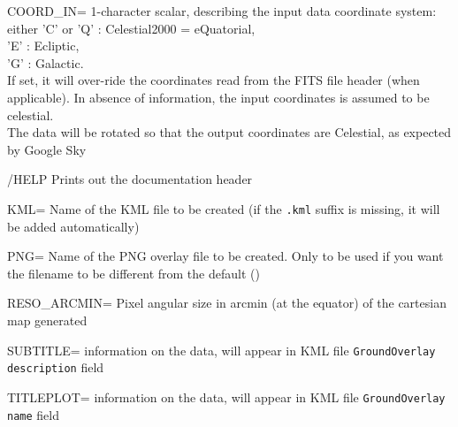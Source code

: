 \begin{keywords}
  \begin{kwlist}{} %
\item [COORD\_IN= \mytarget{idl:hpx2gs:coord_in}] 1-character scalar, describing the input data coordinate system:\\
                either 'C' or 'Q' : Celestial2000 = eQuatorial,\\
                       'E'        : Ecliptic,\\
                       'G'        : Galactic.\\
             If set, it will over-ride the coordinates read from the FITS file header (when
             applicable). In absence of information, the input coordinates is
assumed to be celestial.\\
             The data will be rotated so that the output coordinates are Celestial, as expected by Google Sky

\item [{/HELP} \mytarget{idl:hpx2gs:help}]  Prints out the documentation header 

\item [{KML=} \mytarget{idl:hpx2gs:kml}] Name of the KML file to be created (if the {\tt .kml} suffix is missing,
     it will be added automatically)

\item [{PNG=} \mytarget{idl:hpx2gs:png}] Name of the PNG overlay file to be created. Only to be used if you want the
     filename to be different from the default 
	()

\item [{RESO\_ARCMIN=} \mytarget{idl:hpx2gs:reso_arcmin}] Pixel angular size in arcmin (at the equator) of the cartesian
     map generated 

\item [{SUBTITLE=} \mytarget{idl:hpx2gs:subtitle}] information on the data, 
will appear in KML file {\tt GroundOverlay
     description} field

\item [{TITLEPLOT=} \mytarget{idl:hpx2gs:titleplot}] information on the data, 
will appear in KML file {\tt GroundOverlay
     name} field


\end{kwlist}
\end{keywords}
